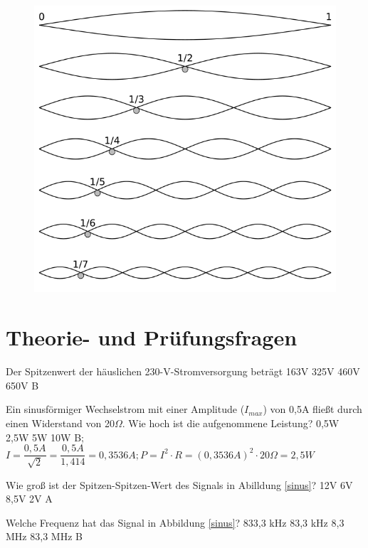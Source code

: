 \begin{figure}
 \vspace{-6cm}
 \includegraphics[scale=0.25]{Signale/Bilder/harmonische.png}
 \vspace{-6cm}
\end{figure}

\section*{Theorie- und Prüfungsfragen} 

{Der Spitzenwert der häuslichen 230-V-Stromversorgung beträgt}%
{163V}%
{325V}%
{460V}%
{650V}%
{B}%


{Ein sinusförmiger Wechselstrom mit einer Amplitude ($I_{max}$) von 0,5A fließt durch einen Widerstand von 20$\Omega$. Wie hoch ist die aufgenommene Leistung?}%
{0,5W}%
{2,5W}%
{5W}%
{10W}%
{B; $I = \dfrac{0,5A}{\sqrt{2}}= \dfrac{0,5A}{1,414} = 0,3536A; P=I^2\cdot R = (0,3536A)^2 \cdot 20 \Omega = 2,5W$}%

{Wie groß ist der Spitzen-Spitzen-Wert des Signals in Abilldung \ref{sinus}?}%
{12V}%
{6V}%
{8,5V}%
{2V}%
{A}%

{Welche Frequenz hat das Signal in Abbildung \ref{sinus}?}%
{833,3 kHz}%
{83,3 kHz}%
{8,3 MHz}%
{83,3 MHz}%
{B}%

